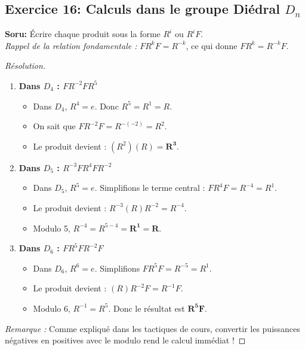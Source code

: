 \documentclass[12pt,a4paper]{report}
\begin{document}
\subsection*{Exercice 16: Calculs dans le groupe Diédral $D_n$}
\textbf{Soru:} Écrire chaque produit sous la forme $R^i$ ou $R^i F$. \\
\textit{Rappel de la relation fondamentale :} $F R^k F = R^{-k}$, ce qui donne $F R^k = R^{-k} F$.
\begin{proof}[Résolution]
\begin{enumerate}
    \item[(a)] \textbf{Dans $D_4$ : $F R^{-2} F R^5$}
    \begin{itemize}
        \item Dans $D_4$, $R^4 = e$. Donc $R^5 = R^1 = R$.
        \item On sait que $F R^{-2} F = R^{-(-2)} = R^2$.
        \item Le produit devient : $(R^2) (R) = \mathbf{R^3}$.
    \end{itemize}
    
    \item[(b)] \textbf{Dans $D_5$ : $R^{-3} F R^4 F R^{-2}$}
    \begin{itemize}
        \item Dans $D_5$, $R^5 = e$. Simplifions le terme central : $F R^4 F = R^{-4} = R^1$.
        \item Le produit devient : $R^{-3} (R) R^{-2} = R^{-4}$.
        \item Modulo 5, $R^{-4} = R^{5-4} = \mathbf{R^1 = R}$.
    \end{itemize}
    
    \item[(c)] \textbf{Dans $D_6$ : $F R^5 F R^{-2} F$}
    \begin{itemize}
        \item Dans $D_6$, $R^6 = e$. Simplifions $F R^5 F = R^{-5} = R^1$.
        \item Le produit devient : $(R) R^{-2} F = R^{-1} F$.
        \item Modulo 6, $R^{-1} = R^5$. Donc le résultat est $\mathbf{R^5 F}$.
    \end{itemize}
\end{enumerate}
\textit{Remarque :} Comme expliqué dans les tactiques de cours, convertir les puissances négatives en positives avec le modulo rend le calcul immédiat !
\end{proof}
\end{document}

